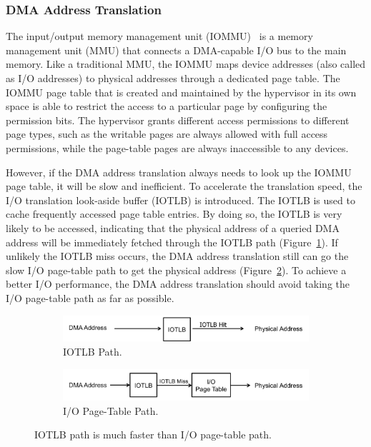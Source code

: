 \subsubsection{DMA Address Translation}
The input/output memory management unit (IOMMU)~\cite{intelvt} is a memory management unit (MMU) that connects a DMA-capable I/O bus to the main memory.
Like a traditional MMU, the IOMMU maps device addresses (also called as I/O addresses) to physical addresses through a dedicated page table.
The IOMMU page table that is created and maintained by the hypervisor in its own space is able to restrict the access to a particular page by configuring the permission bits.
The hypervisor grants different access permissions to different page types, such as the writable pages are always allowed with full access permissions, while the page-table pages are always inaccessible to any devices.

However, if the DMA address translation always needs to look up the IOMMU page table, it will be slow and inefficient.
To accelerate the translation speed, the I/O translation look-aside buffer (IOTLB) is introduced.
The IOTLB is used to cache frequently accessed page table entries.
By doing so, the IOTLB is very likely to be accessed, indicating that the physical address of a queried DMA address will be immediately fetched through the IOTLB path (Figure~\ref{fig:iotlbpath}).
If unlikely the IOTLB miss occurs, the DMA address translation still can go the slow I/O page-table path to get the physical address (Figure~\ref{fig:ioptpath}).
To achieve a better I/O performance, the DMA address translation should avoid taking the I/O page-table path as far as possible.

\begin{figure}[!t]
    \begin{subfigure}{0.45\textwidth}
        \includegraphics[width=1\textwidth]{image/background/DMA-IOTLB-translation.png}
        \caption{\centering IOTLB Path.}
        \label{fig:iotlbpath}
    \end{subfigure}
    \vfill
    \begin{subfigure}{0.45\textwidth}
        \includegraphics[width=1\textwidth]{image/background/DMA-pt-translation.png}
        \caption{\centering I/O Page-Table Path.}
        \label{fig:ioptpath}
    \end{subfigure}
    \caption{IOTLB path is much faster than I/O page-table path.}
    \label{fig:dma-add-trans}
\end{figure}


